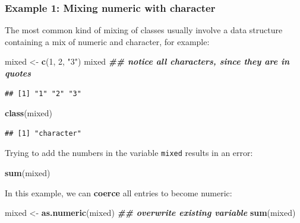 \documentclass[
]{book}
\newenvironment{Shaded}{\begin{snugshade}}{\end{snugshade}}
\newcommand{\DecValTok}[1]{\textcolor[rgb]{0.00,0.00,0.81}{#1}}
\newcommand{\DocumentationTok}[1]{\textcolor[rgb]{0.56,0.35,0.01}{\textbf{\textit{#1}}}}
\newcommand{\FunctionTok}[1]{\textcolor[rgb]{0.13,0.29,0.53}{\textbf{#1}}}
\newcommand{\NormalTok}[1]{#1}
\newcommand{\OtherTok}[1]{\textcolor[rgb]{0.56,0.35,0.01}{#1}}
\newcommand{\StringTok}[1]{\textcolor[rgb]{0.31,0.60,0.02}{#1}}
\theoremstyle{definition}
\theoremstyle{definition}
\theoremstyle{definition}
\theoremstyle{definition}
\theoremstyle{remark}
\begin{document}
\hypertarget{example-1-mixing-numeric-with-character}{%
\subsubsection{Example 1: Mixing numeric with character}\label{example-1-mixing-numeric-with-character}}

The most common kind of mixing of classes usually involve a data structure containing a mix of numeric and character, for example:

\begin{Shaded}
\begin{Highlighting}[]
\NormalTok{mixed }\OtherTok{\textless{}{-}} \FunctionTok{c}\NormalTok{(}\DecValTok{1}\NormalTok{, }\DecValTok{2}\NormalTok{, }\StringTok{"3"}\NormalTok{)}
\NormalTok{mixed }\DocumentationTok{\#\# notice all characters, since they are in quotes}
\end{Highlighting}
\end{Shaded}

\begin{verbatim}
## [1] "1" "2" "3"
\end{verbatim}

\begin{Shaded}
\begin{Highlighting}[]
\FunctionTok{class}\NormalTok{(mixed)}
\end{Highlighting}
\end{Shaded}

\begin{verbatim}
## [1] "character"
\end{verbatim}

Trying to add the numbers in the variable \texttt{mixed} results in an error:

\begin{Shaded}
\begin{Highlighting}[]
\FunctionTok{sum}\NormalTok{(mixed)}
\end{Highlighting}
\end{Shaded}

In this example, we can \textbf{coerce} all entries to become numeric:

\begin{Shaded}
\begin{Highlighting}[]
\NormalTok{mixed }\OtherTok{\textless{}{-}} \FunctionTok{as.numeric}\NormalTok{(mixed) }\DocumentationTok{\#\# overwrite existing variable}
\FunctionTok{sum}\NormalTok{(mixed)}
\end{Highlighting}
\end{Shaded}
\end{document}
